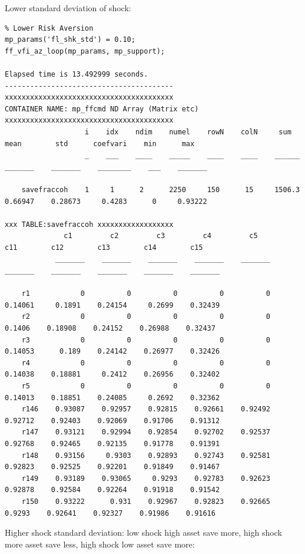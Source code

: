 \documentclass[
]{book}
\begin{document}
Lower standard deviation of shock:

\begin{verbatim}
% Lower Risk Aversion
mp_params('fl_shk_std') = 0.10;
ff_vfi_az_loop(mp_params, mp_support);

Elapsed time is 13.492999 seconds.
----------------------------------------
xxxxxxxxxxxxxxxxxxxxxxxxxxxxxxxxxxxxxxxx
CONTAINER NAME: mp_ffcmd ND Array (Matrix etc)
xxxxxxxxxxxxxxxxxxxxxxxxxxxxxxxxxxxxxxxx
                   i    idx    ndim    numel    rowN    colN     sum       mean        std      coefvari    min      max  
                   _    ___    ____    _____    ____    ____    ______    _______    _______    ________    ___    _______

    savefraccoh    1     1      2      2250     150      15     1506.3    0.66947    0.28673     0.4283      0     0.93222

xxx TABLE:savefraccoh xxxxxxxxxxxxxxxxxx
              c1         c2         c3         c4         c5         c11        c12        c13        c14        c15  
            _______    _______    _______    _______    _______    _______    _______    _______    _______    _______

    r1            0          0          0          0          0    0.14061     0.1891    0.24154     0.2699    0.32439
    r2            0          0          0          0          0     0.1406    0.18908    0.24152    0.26988    0.32437
    r3            0          0          0          0          0    0.14053      0.189    0.24142    0.26977    0.32426
    r4            0          0          0          0          0    0.14038    0.18881     0.2412    0.26956    0.32402
    r5            0          0          0          0          0    0.14013    0.18851    0.24085     0.2692    0.32362
    r146    0.93087    0.92957    0.92815    0.92661    0.92492    0.92712    0.92403    0.92069    0.91706    0.91312
    r147    0.93121    0.92994    0.92854    0.92702    0.92537    0.92768    0.92465    0.92135    0.91778    0.91391
    r148    0.93156     0.9303    0.92893    0.92743    0.92581    0.92823    0.92525    0.92201    0.91849    0.91467
    r149    0.93189    0.93065     0.9293    0.92783    0.92623    0.92878    0.92584    0.92264    0.91918    0.91542
    r150    0.93222      0.931    0.92967    0.92823    0.92665     0.9293    0.92641    0.92327    0.91986    0.91616
\end{verbatim}

Higher shock standard deviation: low shock high asset save more, high
shock more asset save less, high shock low asset save more:
\end{document}
